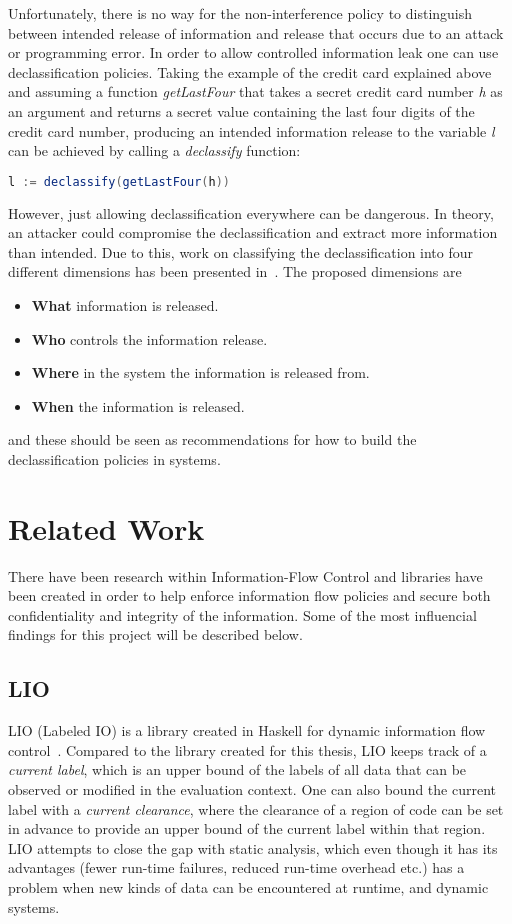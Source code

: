 Unfortunately, there is no way for the non-interference policy to distinguish between intended release of information and release that occurs due to an attack or programming error. In order to allow controlled information leak one can use declassification policies.
Taking the example of the credit card explained above and assuming a function \emph{getLastFour} that takes a secret credit card number \emph{h} as an argument and returns a secret value containing the last four digits of the credit card number, producing an intended information release to the variable \emph{l} can be achieved by calling a \emph{declassify} function:
\begin{center}
  \begin{lstlisting}[language=Java]
    l := declassify(getLastFour(h))
  \end{lstlisting}
\end{center}
However, just allowing declassification everywhere can be dangerous. In theory, an attacker could compromise the declassification and extract more information than intended. Due to this, work on classifying the declassification into four different dimensions has been presented in~\cite{declassification-dimensions}. The proposed dimensions are
\begin{itemize}
  \item \textbf{What} information is released.
  \item \textbf{Who} controls the information release.
  \item \textbf{Where} in the system the information is released from.
  \item \textbf{When} the information is released.
\end{itemize}
and these should be seen as recommendations for how to build the declassification policies in systems.
\section{Related Work}
\label{chapter:related}
There have been research within Information-Flow Control and libraries have been created in order to help enforce information flow policies and secure both confidentiality and integrity of the information. Some of the most influencial findings for this project will be described below.
\subsection{LIO}
LIO (Labeled IO) is a library created in Haskell for dynamic information flow control~\cite{lio-2011}. Compared to the library created for this thesis, LIO keeps track of a \emph{current label}, which is an upper bound of the labels of all data that can be observed or modified in the evaluation context. One can also bound the current label with a \emph{current clearance}, where the clearance of a region of code can be set in advance to provide an upper bound of the current label within that region. LIO attempts to close the gap with static analysis, which even though it has its advantages (fewer run-time failures, reduced run-time overhead etc.) has a problem when new kinds of data can be encountered at runtime, and dynamic systems.
